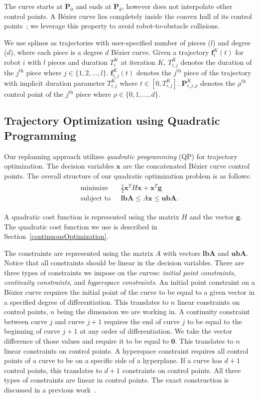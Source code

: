 \documentclass{svproc}
\newcommand{\vP}{\mathbf{P}}
\newcommand{\vg}{\mathbf{g}}
\newcommand{\vf}{\mathbf{f}}
\newcommand{\vx}{\mathbf{x}}
\newcommand{\vzero}{\mathbf{0}}
\newcommand{\vlbA}{\mathbf{lbA}}
\newcommand{\vubA}{\mathbf{ubA}}
\renewcommand{\th}{^{\text{th}}}
\begin{document}
The curve starts at $\vP_0$ and ends at $\vP_d$, however does not interpolate other control points.
A B\'ezier curve lies completely inside the convex hull of its control points~\cite{Bernstein};
we leverage this property to avoid robot-to-obstacle collisions.

We use splines as trajectories with user-specified number of pieces ($l$) and degree ($d$), where each piece is a degree $d$ B\'ezier curve.
Given a trajectory $\vf^{K}_i(t)$ for robot $i$ with $l$ pieces and duration $T^{K}_i$ at iteration $K$, $T^{K}_{i,j}$ denotes the duration of the $j\th$ piece where $j \in \{1,2,\ldots,l\}$.
$\vf^{K}_{i,j}(t)$ denotes the $j\th$ piece of the trajectory with implicit duration parameter $T^K_{i,j}$ where $t\in[0, T^{K}_{i,j}]$. $\vP^{K}_{i,j,\rho}$ denotes the $\rho\th$ control point of the $j\th$ piece where $\rho \in \{0,1,\ldots,d\}$.

\subsection{Trajectory Optimization using Quadratic Programming} \label{trajectoryOptimization}
Our replanning approach utilizes \emph{quadratic programming} (QP) for trajectory optimization.
The decision variables $\vx$ are the concatenated B\'ezier curve control points.
The overall structure of our quadratic optimization problem is as follows:
\begin{align}
\begin{split}
    \text{minimize}\ \ \ &\frac{1}{2}\vx^TH\vx + \vx^T\vg\\
    \text{subject to}\ \ \ & \vlbA \leq A\vx \leq \vubA.
\end{split}
\end{align}

A quadratic cost function is represented using the matrix $H$ and the vector $\vg$. 
The quadratic cost function we use is described in Section~\ref{continuousOptimization}.

The constraints are represented using the matrix $A$ with vectors $\vlbA$ and $\vubA$.
Notice that all constraints should be linear in the decision variables.
There are three types of constraints we impose on the curves: \emph{initial point constraints}, \emph{continuity constraints}, and \emph{hyperspace constraints}.
An initial point constraint on a B\'ezier curve requires the initial point of the curve to be equal to a given vector in a specified degree of differentiation. This translates to $n$ linear constraints on control points, $n$ being the dimension we are working in.
A continuity constraint between curve $j$ and curve $j+1$ requires the end of curve $j$ to be equal to the beginning of curve $j+1$ at any order of differentiation.
We take the vector difference of those values and require it to be equal to $\vzero$. This translates to $n$ linear constraints on control points.
A hyperspace constraint requires all control points of a curve to be on a specific side of a hyperplane. If a curve has $d+1$ control points, this translates to $d+1$ constraints on control points. All three types of constraints are linear in control points. The exact construction is discussed in a previous work~\cite{crazyplanning-ieeetro}.
\end{document}
